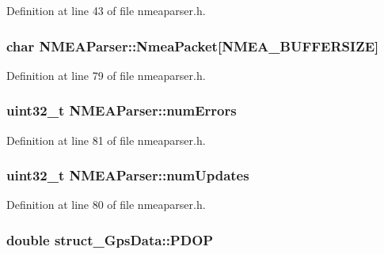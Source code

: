 \-Definition at line 43 of file nmeaparser.\-h.

\hypertarget{group___g_p_s_gadget_plugin_ga3d1bdb9e4264f153e4537750bb8d7fd9}{
\subsubsection[{\-Nmea\-Packet}]{\setlength{\rightskip}{0pt plus 5cm}char {\bf \-N\-M\-E\-A\-Parser\-::\-Nmea\-Packet}\mbox{[}\-N\-M\-E\-A\-\_\-\-B\-U\-F\-F\-E\-R\-S\-I\-Z\-E\mbox{]}}}\label{group___g_p_s_gadget_plugin_ga3d1bdb9e4264f153e4537750bb8d7fd9}


\-Definition at line 79 of file nmeaparser.\-h.

\hypertarget{group___g_p_s_gadget_plugin_gaef5bd2863b92f02db2ad4ef9e66e9437}{
\subsubsection[{num\-Errors}]{\setlength{\rightskip}{0pt plus 5cm}uint32\-\_\-t {\bf \-N\-M\-E\-A\-Parser\-::num\-Errors}}}\label{group___g_p_s_gadget_plugin_gaef5bd2863b92f02db2ad4ef9e66e9437}


\-Definition at line 81 of file nmeaparser.\-h.

\hypertarget{group___g_p_s_gadget_plugin_ga08ee9a94774bf6691a26d600e1ea51a9}{
\subsubsection[{num\-Updates}]{\setlength{\rightskip}{0pt plus 5cm}uint32\-\_\-t {\bf \-N\-M\-E\-A\-Parser\-::num\-Updates}}}\label{group___g_p_s_gadget_plugin_ga08ee9a94774bf6691a26d600e1ea51a9}


\-Definition at line 80 of file nmeaparser.\-h.

\hypertarget{group___g_p_s_gadget_plugin_ga686c0fa6dc1d7aa494b494fe38bb8834}{
\subsubsection[{\-P\-D\-O\-P}]{\setlength{\rightskip}{0pt plus 5cm}double {\bf struct\-\_\-\-Gps\-Data\-::\-P\-D\-O\-P}}}\label{group___g_p_s_gadget_plugin_ga686c0fa6dc1d7aa494b494fe38bb8834}


